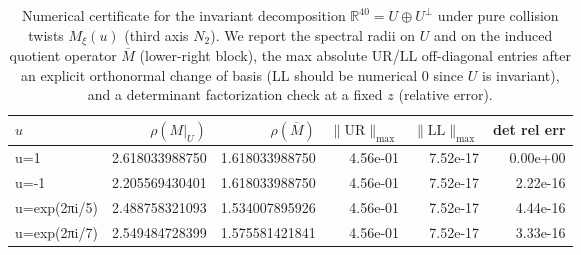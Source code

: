 \begin{table}[H]
\centering
\scriptsize
\setlength{\tabcolsep}{6pt}
\caption{Numerical certificate for the invariant decomposition $\mathbb R^{40}=U\oplus U^\perp$ under pure collision twists $M_\xi(u)$ (third axis $N_2$). We report the spectral radii on $U$ and on the induced quotient operator $\overline M$ (lower-right block), the max absolute UR/LL off-diagonal entries after an explicit orthonormal change of basis (LL should be numerical $0$ since $U$ is invariant), and a determinant factorization check at a fixed $z$ (relative error).}
\label{tab:real_input_40_pure_collision_block_factorization}
\begin{tabular}{l r r r r r}
\toprule
$u$ & $\rho(M|_U)$ & $\rho(\overline M)$ & $\|\mathrm{UR}\|_{\max}$ & $\|\mathrm{LL}\|_{\max}$ & det rel err\\
\midrule
u=1 & 2.618033988750 & 1.618033988750 & 4.56e-01 & 7.52e-17 & 0.00e+00\\
u=-1 & 2.205569430401 & 1.618033988750 & 4.56e-01 & 7.52e-17 & 2.22e-16\\
u=exp(2πi/5) & 2.488758321093 & 1.534007895926 & 4.56e-01 & 7.52e-17 & 4.44e-16\\
u=exp(2πi/7) & 2.549484728399 & 1.575581421841 & 4.56e-01 & 7.52e-17 & 3.33e-16\\
\bottomrule
\end{tabular}
\end{table}
